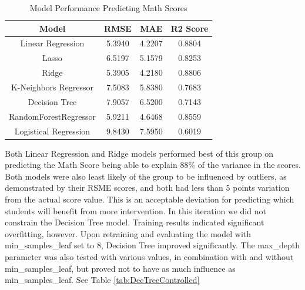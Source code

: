 \documentclass[doc]{apa6} %
\begin{document}
\begin{table}[H]
    \centering
    \begin{tabular}{|c|c|c|c|}
    \hline
         Model & RMSE & MAE & R2 Score\\
         \hline\hline
         Linear Regression & 5.3940 & 4.2207 & 0.8804\\
         \hline
         Lasso & 6.5197 & 5.1579 & 0.8253\\
         \hline
         Ridge & 5.3905 & 4.2180 & 0.8806\\
         \hline
         K-Neighbors Regressor & 7.5083 & 5.8380 & 0.7683\\
         \hline
         Decision Tree & 7.9057 & 6.5200 & 0.7143\\
         \hline
         RandomForestRegressor & 5.9211 & 4.6468 & 0.8559\\
         \hline
         Logistical Regression & 9.8430 & 7.5950 & 0.6019\\
         \hline
    \end{tabular}
    \caption{Model Performance Predicting Math Scores}
    \label{tab:InitModelPerfMath}
\end{table}
Both Linear Regression and Ridge models performed best of this group on predicting the Math Score being able to explain 88\% of the variance in the scores. Both models were also least likely of the group to be influenced by outliers, as demonstrated by their RSME scores, and both had less than 5 points variation from the actual score value.  This is an acceptable deviation for predicting which students will benefit from more intervention.
In this iteration we did not constrain the Decision Tree model. Training results indicated significant overfitting, however. Upon retraining and evaluating the model with min\_samples\_leaf set to 8, Decision Tree improved significantly. The max\_depth parameter was also tested with various values, in combination with and without min\_samples\_leaf, but proved not to have as much influence as min\_samples\_leaf. See Table \ref{tab:DecTreeControlled}
\end{document}
